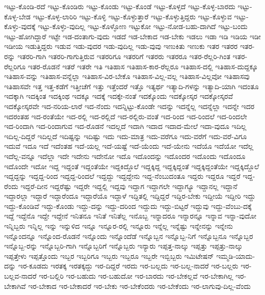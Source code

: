 {ಇಟ್ಟು-ಕೊಂಡಿ-ರದೆ
ಇಟ್ಟು-ಕೊಂಡಿರು
ಇಟ್ಟು-ಕೊಂಡು
ಇಟ್ಟು-ಕೊಂಡೆ
ಇಟ್ಟು-ಕೊಳ್ಳದೆ
ಇಟ್ಟು-ಕೊಳ್ಳ-ಬಾರದು
ಇಟ್ಟು-ಕೊಳ್ಳ-ಬೇಡ
ಇಟ್ಟು-ಕೊಳ್ಳ-ಲಾರಿರಿ
ಇಟ್ಟು-ಕೊಳ್ಳಿ
ಇಟ್ಟು-ಕೊಳ್ಳುತ್ತಾರೆ
ಇಟ್ಟು-ಕೊಳ್ಳುತ್ತಿದ್ದರು
ಇಟ್ಟು-ಕೊಳ್ಳುವ
ಇಟ್ಟು-ಕೊಳ್ಳು-ವುದಕ್ಕೆ
ಇಟ್ಟು-ಕೊಳ್ಳು-ವುದಿಲ್ಲ
ಇಟ್ಟು-ಕೊಳ್ಳೋಣ
ಇಟ್ಟುಕೋ
ಇಟ್ಟು-ನೋಡ-ಬಹು-ದಾಗಿದೆ
ಇಟ್ಟು-ಬಂದು
ಇಟ್ಟು-ಹೋಗಿದ್ದಾರೆ
ಇಟ್ಟೇ
ಇಡ-ದಂತಾಗು-ವುದು
ಇಡದೆ
ಇಡ-ಬೇಕಾದ
ಇಡ-ಬೇಕು
ಇಡಲು
ಇಡಾ
ಇಡಿ
ಇಡಿಯ
ಇಡೀ
ಇಡೀಯ
ಇಡುತ್ತಿದ್ದರು
ಇಡುವ
ಇಡು-ವುದರ
ಇಡು-ವುದಿಲ್ಲ
ಇಡು-ವುವು
ಇಣುಕಿತು
ಇಣುಕು
ಇತರ
ಇತರರ
ಇತರ-ರನ್ನು
ಇತರರಿ-ಗಾಗಿ
ಇತರರಿ-ಗಾಗುತ್ತಿರುವ
ಇತರರಿಗೂ
ಇತರರಿಗೆ
ಇತರರು
ಇತರರೂ
ಇತರ-ರೆಲ್ಲರಿ-ಗಿಂತ
ಇತರ-ರೆಲ್ಲರಿಗೂ
ಇತರ-ರೊಡನೆ
ಇತರೆ
ಇತರೇ
ಇತಿ
ಇತಿಹಾಸ
ಇತಿಹಾಸ-ಕಾರ-ರೆಲ್ಲರೂ
ಇತಿಹಾಸ-ದಲ್ಲಿ
ಇತಿಹಾಸ-ದುದ್ದಕ್ಕೂ
ಇತಿಹಾಸ-ವನ್ನು
ಇತಿಹಾಸ-ವನ್ನೆಲ್ಲಾ
ಇತಿಹಾಸ-ವಿರ-ಬೇಕೊ
ಇತಿಹಾಸ-ವಿಲ್ಲ-ವಲ್ಲ
ಇತಿಹಾಸ-ವಿಲ್ಲವೋ
ಇತಿಹಾಸವು
ಇತಿಹಾಸವೇ
ಇತ್ತ
ಇತ್ತ-ಕಡೆಗೆ
ಇತ್ತೀಚೆಗೆ
ಇತ್ತು
ಇತ್ತೆಂದರೆ
ಇತ್ತೊ
ಇತ್ಯರ್ಥ
ಇತ್ಯಾದಿ-ಗಳನ್ನು
ಇತ್ಯಾದಿ-ಯಾಗಿ
ಇದಂತೂ
ಇದಕ್ಕಾಗಿ
ಇದಕ್ಕಿಂತ
ಇದಕ್ಕಿಂಥ
ಇದಕ್ಕೂ
ಇದಕ್ಕೆ
ಇದಕ್ಕೇ-ನಂತೆ
ಇದಕ್ಕೊಂದು
ಇದಕ್ಕೋಸ್ಕರ
ಇದಕ್ಕೋಸ್ಕರವೆ
ಇದಕ್ಕೋಸ್ಕರವೇ
ಇದ-ನರಿಯ-ಲಾರೆ
ಇದ-ನೆಂದು
ಇದನ್ನಿಟ್ಟು-ಕೊಂಡೇ
ಇದನ್ನು
ಇದನ್ನೆಲ್ಲ
ಇದನ್ನೆಲ್ಲಾ
ಇದನ್ನೇ
ಇದರ
ಇದರಂತಹ
ಇದ-ರಂತೆಯೇ
ಇದ-ರಲ್ಲಿ
ಇದ-ರಲ್ಲಿದೆ
ಇದ-ರಲ್ಲಿರು-ವಂತೆ
ಇದ-ರಿಂದ
ಇದ-ರಿಂದಲೆ
ಇದ-ರಿಂದಲೇ
ಇದ-ರಿಂದಾಗಿ
ಇದ-ರಿಂದಾಗುವ
ಇದ-ರೊಡನೆ
ಇದಲ್ಲದೆ
ಇದಾಗಿ
ಇದಾದ
ಇದಾದ-ಮೇಲೆ
ಇದಾ-ವುದೂ
ಇದಿಲ್ಲ
ಇದಿಲ್ಲ-ದಿದ್ದರೆ
ಇದಿಲ್ಲದೆ
ಇದಿಷ್ಟನ್ನು
ಇದಿಷ್ಟು
ಇದು
ಇದು-ಮಾತ್ರ
ಇದು-ವರೆಗೂ
ಇದು-ವರೆಗೆ
ಇದು-ವರೆ-ವಿಗೂ
ಇದುವೆ
ಇದೂ
ಇದೆ
ಇದೆಂತಹ
ಇದೆ-ಯಲ್ಲ
ಇದೆ-ಯಷ್ಟೆ
ಇದೆ-ಯೆಂದು
ಇದೆ-ಯೇನು
ಇದೆಯೊ
ಇದೆಯೋ
ಇದೆಲ್ಲ
ಇದೆಲ್ಲ-ವನ್ನೂ
ಇದೆಲ್ಲಾ
ಇದೇ
ಇದೇನು
ಇದೇನೋ
ಇದೊ
ಇದೊಂದನ್ನು
ಇದೊಂದರ
ಇದೊಂದು
ಇದೊಂದೂ
ಇದೊಂದೇ
ಇದೋ
ಇದ್ದ
ಇದ್ದಂತೆ
ಇದ್ದಂತೆಯೇ
ಇದ್ದಕಿದ್ದೊಲೆ
ಇದ್ದಕ್ಕಿದ್ದ
ಇದ್ದಕ್ಕಿದ್ದಂತೆ
ಇದ್ದಕ್ಕಿದ್ದಂತೆಯೇ
ಇದ್ದಕ್ಕಿದ್ದೊಲೆ
ಇದ್ದದ್ದನ್ನು
ಇದ್ದದ್ದ-ರಿಂದ
ಇದ್ದದ್ದ-ರಿಂದಲೆ
ಇದ್ದದ್ದು
ಇದ್ದದ್ದೇನು
ಇದ್ದ-ನೆಂಬುದಂತೂ
ಇದ್ದರು
ಇದ್ದರೂ
ಇದ್ದರೆ
ಇದ್ದ-ರೆಂದು
ಇದ್ದರೆ-ದೀನ
ಇದ್ದರೆಷ್ಟು
ಇದ್ದರೇ
ಇದ್ದಲ್ಲಿ
ಇದ್ದವು
ಇದ್ದಾಗ
ಇದ್ದಾಗಲೇ
ಇದ್ದಾಗ್ಯೂ
ಇದ್ದಾನಲ್ಲ
ಇದ್ದಾನೆ
ಇದ್ದಾರಲ್ಲಾ
ಇದ್ದಾರೆ
ಇದ್ದಾರೆಂದೂ
ಇದ್ದಾರೆಯೊ
ಇದ್ದಾಳೆ
ಇದ್ದಿತಲ್ಲಿ
ಇದ್ದಿದ್ದರೆ
ಇದ್ದಿರ-ಬೇಕು
ಇದ್ದೀಯೆ
ಇದ್ದೀರಿ
ಇದ್ದು
ಇದ್ದು-ಕೊಂಡಿವೆ
ಇದ್ದು-ಕೊಂಡು
ಇದ್ದು-ದನ್ನು
ಇದ್ದು-ದರಿಂದ
ಇದ್ದುದು
ಇದ್ದು-ಬಿಟ್ಟರೆ
ಇದ್ದುವು
ಇದ್ದು-ವೆಂಬು-ದಕ್ಕೆ
ಇದ್ದೆ
ಇದ್ದೆನೊ
ಇದ್ದೇ
ಇದ್ದೇನೆ
ಇನಿತನೂ
ಇನಿತೆ
ಇನಿತೆಲ್ಲ
ಇನೊಬ್ಬ
ಇನ್ನಾದರೂ
ಇನ್ನಾರನ್ನೂ
ಇನ್ನಾವ
ಇನ್ನಾ-ವುದೋ
ಇನ್ನಿಬ್ಬರು
ಇನ್ನಿಲ್ಲ
ಇನ್ನು
ಇನ್ನುಳಿದ
ಇನ್ನೂ
ಇನ್ನೂರ-ರಲ್ಲಿ
ಇನ್ನೂರು
ಇನ್ನೆಲ್ಲ
ಇನ್ನೆಷ್ಟು
ಇನ್ನೇನನ್ನು
ಇನ್ನೇನು
ಇನ್ನೊಂದನ್ನೂ
ಇನ್ನೊಂದ-ರೊಡನೆ
ಇನ್ನೊಂದು
ಇನ್ನೊಂದೆಡೆ
ಇನ್ನೊಬ್ಬನ
ಇನ್ನೊಬ್ಬ-ನಿಗೆ
ಇನ್ನೊಬ್ಬನೂ
ಇನ್ನೊಬ್ಬರ
ಇನ್ನೊಬ್ಬ-ರನ್ನು
ಇನ್ನೊಬ್ಬರಿ-ಗಾಗಿ
ಇನ್ನೊಬ್ಬರಿಗೆ
ಇನ್ನೊಬ್ಬರು
ಇನ್ಯಾರು
ಇಪ್ಪತ್ತ-ನಾಲ್ಕು
ಇಪ್ಪತ್ತು
ಇಪ್ಪತ್ತು-ನಾಲ್ಕು
ಇಪ್ಪತ್ತೇಳು
ಇಪ್ಪತ್ತೊಂದು
ಇಬ್ಬರ
ಇಬ್ಬರಿಗೂ
ಇಬ್ಬರು
ಇಬ್ಬರೂ
ಇಬ್ಬರೇ
ಇಬ್ಬಿಬ್ಬರು
ಇಮಿಟೇಷನ್
ಇಮ್ಮಡಿ-ಯಾದು-ದನ್ನು
ಇರ-ಕೂಡದು
ಇರತಕ್ಕ
ಇರತಕ್ಕದ್ದು
ಇರ-ದಿದ್ದರೆ
ಇರದು
ಇರ-ಬಲ್ಲದು
ಇರ-ಬಲ್ಲ-ನಾದರೆ
ಇರ-ಬಲ್ಲರು
ಇರ-ಬಲ್ಲವ-ನಾದರೆ
ಇರ-ಬಲ್ಲಿರಿ
ಇರ-ಬಹುದು
ಇರ-ಬಹುದೋ
ಇರ-ಬಾರದು
ಇರ-ಬೇಕಲ್ಲವೆ
ಇರ-ಬೇಕಾಗಿಲ್ಲ
ಇರ-ಬೇಕಾಗಿವೆ
ಇರ-ಬೇಕಾದ
ಇರ-ಬೇಕಾದರೆ
ಇರ-ಬೇಕು
ಇರ-ಬೇಕೆಂದರು
ಇರ-ಬೇಕೆಂದು
ಇರ-ಲಾಗುವು-ದಿಲ್ಲ-ವೆಂದು
}
